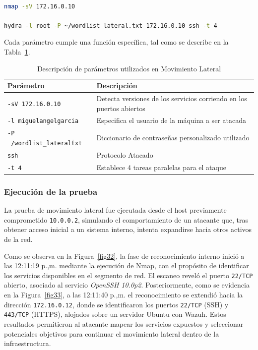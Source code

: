 \begin{lstlisting}[language=bash]

nmap -sV 172.16.0.10

hydra -l root -P ~/wordlist_lateral.txt 172.16.0.10 ssh -t 4

\end{lstlisting}

Cada parámetro cumple una función específica, tal como se describe en la Tabla~\ref{tab:parametros_movimiento_lateral}.

\begin{table}[H]
	\centering
	\caption{Descripción de parámetros utilizados en Movimiento Lateral}\label{tab:parametros_movimiento_lateral}
	\renewcommand{\arraystretch}{1.4}
	\begin{tabular}{|p{4.2cm}|p{8.5cm}|}
	\hline
	\rowcolor{gray!25}
	\centering \textbf{Parámetro} & \centering \textbf{Descripción} \tabularnewline
	\hline

	\centering \texttt{-sV 172.16.0.10} &
	Detecta versiones de los servicios corriendo en los puertos abiertos
	\tabularnewline
	\hline

	\centering \texttt{-l miguelangelgarcia} &
	Especifica el usuario de la máquina a ser atacada
	\tabularnewline
	\hline

	\centering \texttt{-P ~/wordlist\_lateral\.txt} &
	Diccionario de contraseñas personalizado utilizado
	\tabularnewline
	\hline

	\centering \texttt{ssh} &
	Protocolo Atacado
	\tabularnewline
	\hline

	\centering \texttt{-t 4} &
	Establece 4 tareas paralelas para el ataque
	\tabularnewline
	\hline
	\end{tabular}
\end{table}

\subsubsection{Ejecución de la prueba}
\noindent

La prueba de movimiento lateral fue ejecutada desde el host previamente comprometido \texttt{10.0.0.2}, simulando el 
comportamiento de un atacante que, tras obtener acceso inicial a un sistema interno, intenta expandirse hacia otros 
activos de la red.

Como se observa en la Figura~\ref{fig32}, la fase de reconocimiento interno inició a las 12:11:19 p.,m. mediante la 
ejecución de Nmap, con el propósito de identificar los servicios disponibles en el segmento de red. El escaneo reveló el 
puerto \texttt{22/TCP} abierto, asociado al servicio \textit{OpenSSH 10.0p2}. Posteriormente, como se evidencia en la 
Figura~\ref{fig33}, a las 12:11:40 p.,m. el reconocimiento se extendió hacia la dirección \texttt{172.16.0.12}, donde se 
identificaron los puertos \texttt{22/TCP} (SSH) y \texttt{443/TCP} (HTTPS), alojados sobre un servidor Ubuntu con Wazuh. 
Estos resultados permitieron al atacante mapear los servicios expuestos y seleccionar potenciales objetivos para continuar 
el movimiento lateral dentro de la infraestructura.

